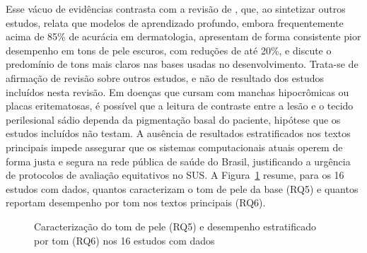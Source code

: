 Esse vácuo de evidências contrasta com a revisão de , que, ao sintetizar outros
estudos, relata que modelos de aprendizado profundo, embora frequentemente acima de 85\% de acurácia em
dermatologia, apresentam de forma consistente pior desempenho em tons de pele escuros, com reduções de até
20\%, e discute o predomínio de tons mais claros nas bases usadas no desenvolvimento. Trata-se de afirmação de
revisão sobre outros estudos, e não de resultado dos estudos incluídos nesta revisão. Em doenças que cursam
com manchas hipocrômicas ou placas eritematosas,
é possível que a leitura de contraste entre a lesão e o tecido perilesional sádio dependa da
pigmentação basal do paciente, hipótese que os estudos incluídos não testam. A ausência de resultados estratificados nos textos principais impede
assegurar que os sistemas computacionais atuais operem de forma justa e segura na rede pública de saúde
do Brasil, justificando a urgência de protocolos de avaliação equitativos no SUS. A
Figura~\ref{fig:vazio-tom-pele} resume, para os 16 estudos com dados, quantos caracterizam o tom de pele da
base (RQ5) e quantos reportam desempenho por tom nos textos principais (RQ6).

\begin{figure}[htbp]
\centering
\caption{Caracterização do tom de pele (RQ5) e desempenho estratificado por tom (RQ6) nos 16 estudos com dados}
\label{fig:vazio-tom-pele}
\end{figure}

